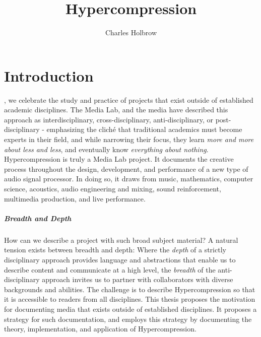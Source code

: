 \documentclass{tufte-book}
\title{Hypercompression}
\author{Charles Holbrow}
\newcommand{\thesis}{Hypercompression\xspace}
\begin{document}
\frontmatter

\maketitle

\tableofcontents

\mainmatter

\cleardoublepage
\chapter{Introduction}
\label{ch:introduction}

\begin{fullwidth}
  , we celebrate the study and practice
  of projects that exist outside of established academic
  disciplines. The Media Lab, and the media have described this
  approach as interdisciplinary, cross-disciplinary,
  anti-disciplinary, or post-disciplinary - emphasizing the clich\'{e}
  that traditional academics must become experts in their field, and
  while narrowing their focus, they learn \textit{more and more about
    less and less}, and eventually know \textit{everything about
    nothing}.  \thesis is truly a Media Lab project. It documents the
  creative process throughout the design, development, and performance of
  a new type of audio signal processor. In doing so, it draws from
  music, mathematics, computer science, acoustics, audio engineering
  and mixing, sound reinforcement, multimedia production, and live
  performance.

\end{fullwidth}

\paragraph{Breadth and Depth} How can we describe a project with such
broad subject material?  A natural tension exists between breadth and
depth: Where the \textit{depth} of a strictly disciplinary approach
provides language and abstractions that enable us to describe content
and communicate at a high level, the \textit{breadth} of the
anti-disciplinary approach invites us to partner with collaborators
with diverse backgrounds and abilities. The challenge is to describe
\thesis so that it is accessible to readers from all disciplines. This
thesis proposes the motivation for documenting media that exists
outside of established disciplines. It proposes a strategy for such
documentation, and employs this strategy by documenting the theory,
implementation, and application of \thesis.
\end{document}
